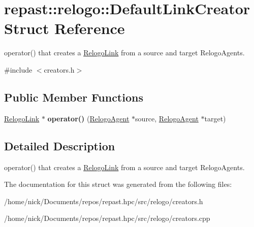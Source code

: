 \hypertarget{structrepast_1_1relogo_1_1_default_link_creator}{\section{repast\-:\-:relogo\-:\-:Default\-Link\-Creator Struct Reference}
\label{structrepast_1_1relogo_1_1_default_link_creator}
}


operator() that creates a \hyperlink{classrepast_1_1relogo_1_1_relogo_link}{Relogo\-Link} from a source and target Relogo\-Agents.  




{\ttfamily \#include $<$creators.\-h$>$}

\subsection*{Public Member Functions}
\begin{DoxyCompactItemize}
\item 
\hypertarget{structrepast_1_1relogo_1_1_default_link_creator_a1ad7ec806173027b48ab7095c442665e}{\hyperlink{classrepast_1_1relogo_1_1_relogo_link}{Relogo\-Link} $\ast$ {\bfseries operator()} (\hyperlink{classrepast_1_1relogo_1_1_relogo_agent}{Relogo\-Agent} $\ast$source, \hyperlink{classrepast_1_1relogo_1_1_relogo_agent}{Relogo\-Agent} $\ast$target)}\label{structrepast_1_1relogo_1_1_default_link_creator_a1ad7ec806173027b48ab7095c442665e}

\end{DoxyCompactItemize}


\subsection{Detailed Description}
operator() that creates a \hyperlink{classrepast_1_1relogo_1_1_relogo_link}{Relogo\-Link} from a source and target Relogo\-Agents. 

The documentation for this struct was generated from the following files\-:\begin{DoxyCompactItemize}
\item 
/home/nick/\-Documents/repos/repast.\-hpc/src/relogo/creators.\-h\item 
/home/nick/\-Documents/repos/repast.\-hpc/src/relogo/creators.\-cpp\end{DoxyCompactItemize}
